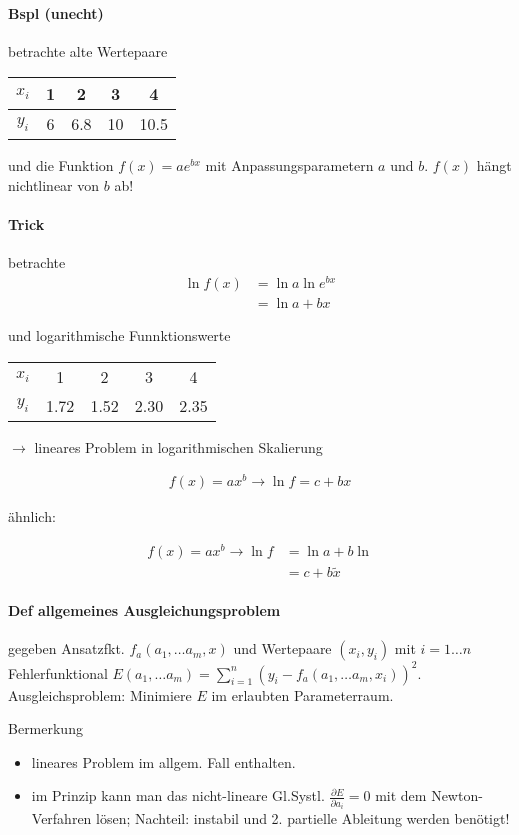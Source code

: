 \documentclass[a4paper,ngerman]{scrbook}
\begin{document}
\paragraph{Bspl (unecht)}

betrachte alte Wertepaare
\begin{tabular}{c|cccc}
  $x_i$ & 1 & 2 & 3 & 4\\\hline
  $y_i$ & 6 & 6.8 & 10 & 10.5
\end{tabular} und die Funktion $f(x) = ae^{bx}$ mit Anpassungsparametern $a$ und $b$. $f(x)$ hängt nichtlinear von $b$ ab!

\paragraph{Trick}

betrachte
\begin{align*}
  \ln f(x) &= \ln a  \ln e^{bx}\\
  &= \ln a + bx
\end{align*}

und logarithmische Funnktionswerte

\begin{tabular}{c|cccc}
  $x_i$ & 1 & 2 & 3 & 4\\
  $y_i$ & 1.72 & 1.52 & 2.30 & 2.35
\end{tabular}

$\to$ lineares Problem in logarithmischen Skalierung

\begin{align*}
  f(x) = ax^b \to \boxed{\ln f = c + bx}
\end{align*}

ähnlich:

\begin{align*}
f(x) = ax^b \to \ln f &= \ln a + b \ln\\
&= c + b \tilde{x}
\end{align*}

\paragraph{Def allgemeines Ausgleichungsproblem}

gegeben Ansatzfkt. $f_a(a_1,\dots a_m, x)$ und Wertepaare $(x_i, y_i)$ mit $i = 1\dots n$ Fehlerfunktional $E(a_1,\dots a_m) = \sum_{i=1}^n (y_i - f_a(a_1,\dots a_m, x_i))^2$. Ausgleichsproblem: Minimiere $E$ im erlaubten Parameterraum.

Bermerkung
\begin{itemize}
\item lineares Problem im allgem. Fall enthalten.
\item im Prinzip kann man das nicht-lineare Gl.Systl. $\frac{\partial E}{\partial a_i} = 0$ mit dem Newton-Verfahren lösen; Nachteil: instabil und 2. partielle Ableitung werden benötigt!
\end{itemize}
\end{document}
